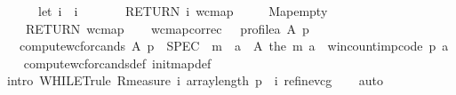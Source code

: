 \begin{isabellebody}
\ \ \ \ \ \ let\ i\ {\isacharequal}{\kern0pt}\ i\ {\isacharplus}{\kern0pt}\ {}{\isacharsemicolon}{\kern0pt}\isanewline
\ \ \ \ \ RETURN\ {\isacharparenleft}{\kern0pt}i{\isacharcomma}{\kern0pt}\ wcmap{\isacharparenright}{\kern0pt}\isanewline
\ \ \ \ {\isacharbraceright}{\kern0pt}{\isacharparenright}{\kern0pt}{\isacharparenleft}{\kern0pt}{}{\isacharcomma}{\kern0pt}\ Map{\isachardot}{\kern0pt}empty{\isacharparenright}{\kern0pt}{\isacharsemicolon}{\kern0pt}\isanewline
\ \ \ \ RETURN\ wcmap\isanewline
\ \ {\isacharbraceright}{\kern0pt}{\isachardoublequoteclose}\isanewline
\isanewline
{}\isamarkupfalse%
\ wcmap{\isacharunderscore}{\kern0pt}correc\ {\isacharcolon}{\kern0pt}\ \ {\isachardoublequoteopen}profile{\isacharunderscore}{\kern0pt}a\ A\ p{\isachardoublequoteclose}\isanewline
\ \ \ {\isachardoublequoteopen}computewcforcands\ A\ p\ {\isasymle}\ SPEC\ {\isacharparenleft}{\kern0pt}{\isasymlambda}\ m{\isachardot}{\kern0pt}\ {\isasymforall}\ a\ {\isasymin}\ A{\isachardot}{\kern0pt}\ {\isacharparenleft}{\kern0pt}the\ {\isacharparenleft}{\kern0pt}m\ a{\isacharparenright}{\kern0pt}{\isacharparenright}{\kern0pt}\ {\isacharequal}{\kern0pt}\ win{\isacharunderscore}{\kern0pt}count{\isacharunderscore}{\kern0pt}imp{\isacharunderscore}{\kern0pt}code\ p\ a{\isacharparenright}{\kern0pt}{\isachardoublequoteclose}\isanewline
%
\isadelimproof
\ \ %
\endisadelimproof
%
\isatagproof
{}\isamarkupfalse%
\ computewcforcands{\isacharunderscore}{\kern0pt}def\ initmap{\isacharunderscore}{\kern0pt}def\isanewline
\ \ \isamarkupfalse%
\ {\isacharparenleft}{\kern0pt}intro\ WHILET{\isacharunderscore}{\kern0pt}rule{\isacharbrackleft}{\kern0pt}\ R{\isacharequal}{\kern0pt}{\isachardoublequoteopen}measure\ {\isacharparenleft}{\kern0pt}{\isasymlambda}{\isacharparenleft}{\kern0pt}i{\isacharcomma}{\kern0pt}{\isacharunderscore}{\kern0pt}{\isacharparenright}{\kern0pt}{\isachardot}{\kern0pt}\ {\isacharparenleft}{\kern0pt}array{\isacharunderscore}{\kern0pt}length\ p{\isacharparenright}{\kern0pt}\ {\isacharminus}{\kern0pt}\ i{\isacharparenright}{\kern0pt}{\isachardoublequoteclose}{\isacharbrackright}{\kern0pt}\ refine{\isacharunderscore}{\kern0pt}vcg{\isacharparenright}{\kern0pt}\isanewline
\ \ \isamarkupfalse%
\ auto\isanewline
\ \ \isamarkupfalse%
%
\endisatagproof
{\isafoldproof}%
%
\isadelimproof
%
\endisadelimproof
\ \isanewline
%
\isadelimtheory
\isanewline
%
\endisadelimtheory
%
\isatagtheory
{}\isamarkupfalse%
%
\endisatagtheory
{\isafoldtheory}%
%
\isadelimtheory
%
\endisadelimtheory
%
\end{isabellebody}%
